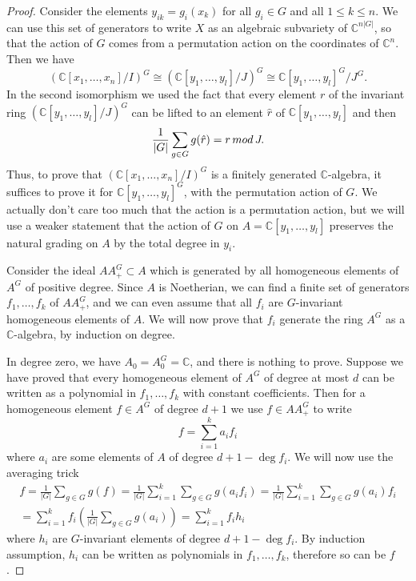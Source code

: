 \documentclass[11pt]{article}
\numberwithin{equation}{section}
\numberwithin{footnote}{section}
\newcommand{\C}{{\mathbb C}}
\begin{document}
\begin{proof}
Consider the elements $y_{ik} = g_i(x_k)$ for all $g_i\in G$ and all $1\leq k\leq n$. We can use this set of generators to write $X$ as an algebraic subvariety of $\C^{n|G|}$, so that the action of $G$ comes from a permutation action on the coordinates of $\C^n$.
Then we have 
$$
(\C[x_1,\ldots,x_n]/I)^G \cong (\C[y_1,\ldots,y_l]/J)^G\cong \C[y_1,\ldots,y_l]^G/J^G.
$$
In the second isomorphism we used the fact that every element $r$ of the invariant ring  $(\C[y_1,\ldots,y_l]/J)^G$
can be lifted to an element $\hat r$ of  $\C[y_1,\ldots,y_l]$ and then 
$$\frac 1{|G|}\sum_{g\in G} g(\hat r)=r\,{\rm mod}\,J.$$
Thus, to prove that $(\C[x_1,\ldots,x_n]/I)^G$ is a finitely generated $\C$-algebra, it suffices to prove it for
$ \C[y_1,\ldots,y_l]^G$, with the permutation action of $G$.
We actually don't care too much that the action is a permutation action, but we will use a weaker statement that the action of 
$G$ on $A= \C[y_1,\ldots,y_l]$ preserves the natural grading on $A$ by the total degree in $y_i$.  

\smallskip
Consider the ideal $A A_+^G\subset A$ which is generated by all homogeneous elements of $A^G$ of positive degree. Since $A$ is Noetherian, we can find a finite set of generators $f_1,\ldots, f_k$ of $A A_+^G$, and we can even assume that all $f_i$ are $G$-invariant homogeneous elements of $A$. We will now prove that
$f_i$ generate the ring $A^G$ as a $\C$-algebra, by induction on degree.

\smallskip
In degree zero, we have $A_0 = A^G_{0}=\C$, and there is nothing to prove. Suppose we have proved that every homogeneous element of $A^G$ of degree at most $d$ can be written as a polynomial in $f_1,\ldots, f_k$ with constant coefficients. Then for a homogeneous element $f\in A^G$ of degree $d+1$ we use $f\in AA_+^G$ to write 
$$
f = \sum_{i=1}^k a_i f_i
$$
where $a_i$ are some elements of $A$ of degree $d+1-\deg f_i$. We will now use the averaging trick
\begin{align*}
f = \frac 1{|G|} \sum_{g\in G}g(f) =\frac 1{|G|} \sum_{i=1}^k  \sum_{g\in G}g(a_i f_i) 
=\frac 1{|G|} \sum_{i=1}^k  \sum_{g\in G}g(a_i) f_i
\\
=\sum_{i=1}^k  f_i \left(\frac 1{|G|} \sum_{g\in G}g(a_i) \right) = \sum_{i=1}^k f_i h_i
\end{align*}
where $h_i$ are $G$-invariant elements of degree $d+1-\deg f_i$. By induction assumption, $h_i$ can be written as polynomials in $f_1,\ldots,f_k$, therefore so can be $f$.


\end{proof}
\end{document}
